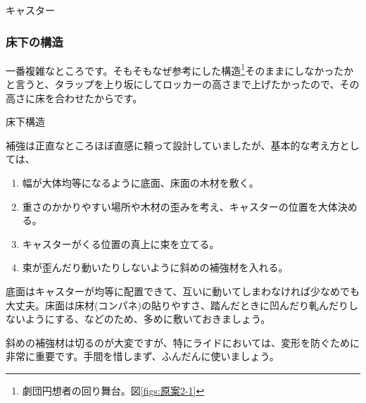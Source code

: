 \documentclass[uplatex,dvipdfmx]{jsarticle}
\begin{document}
\begin{imageHere}{キャスター}
\end{imageHere}

\subsubsection{床下の構造}

一番複雑なところです。そもそもなぜ参考にした構造\footnote{劇団円想者の回り舞台。図\ref{figs:原案2-1}}そのままにしなかったかと言うと、タラップを上り坂にしてロッカーの高さまで上げたかったので、その高さに床を合わせたからです。

\begin{imageHere}{床下構造}
\end{imageHere}

補強は正直なところほぼ直感に頼って設計していましたが、基本的な考え方としては、
\begin{enumerate}
    \item 幅が大体均等になるように底面、床面の木材を敷く。
    \item 重さのかかりやすい場所や木材の歪みを考え、キャスターの位置を大体決める。
    \item キャスターがくる位置の真上に束を立てる。
    \item 束が歪んだり動いたりしないように斜めの補強材を入れる。
\end{enumerate}

底面はキャスターが均等に配置できて、互いに動いてしまわなければ少なめでも大丈夫。床面は床材(コンパネ)の貼りやすさ、踏んだときに凹んだり軋んだりしないようにする、などのため、多めに敷いておきましょう。

斜めの補強材は切るのが大変ですが、特にライドにおいては、変形を防ぐために非常に重要です。手間を惜しまず、ふんだんに使いましょう。
\end{document}
